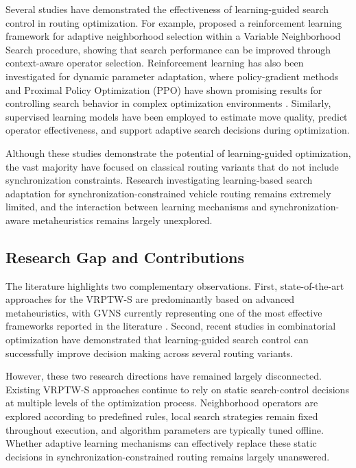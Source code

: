 Several studies have demonstrated the effectiveness of learning-guided search control in routing optimization. For example, \citet{xu2023learning} proposed a reinforcement learning framework for adaptive neighborhood selection within a Variable Neighborhood Search procedure, showing that search performance can be improved through context-aware operator selection. Reinforcement learning has also been investigated for dynamic parameter adaptation, where policy-gradient methods and Proximal Policy Optimization (PPO) have shown promising results for controlling search behavior in complex optimization environments \citep{schulman2017proximal, wang2024csppo}. Similarly, supervised learning models have been employed to estimate move quality, predict operator effectiveness, and support adaptive search decisions during optimization.

Although these studies demonstrate the potential of learning-guided optimization, the vast majority have focused on classical routing variants that do not include synchronization constraints. Research investigating learning-based search adaptation for synchronization-constrained vehicle routing remains extremely limited, and the interaction between learning mechanisms and synchronization-aware metaheuristics remains largely unexplored.

\subsection{Research Gap and Contributions}
The literature highlights two complementary observations. First, state-of-the-art approaches for the VRPTW-S are predominantly based on advanced metaheuristics, with GVNS currently representing one of the most effective frameworks reported in the literature \citep{masmoudi2025generalized}. Second, recent studies in combinatorial optimization have demonstrated that learning-guided search control can successfully improve decision making across several routing variants.

However, these two research directions have remained largely disconnected. Existing VRPTW-S approaches continue to rely on static search-control decisions at multiple levels of the optimization process. Neighborhood operators are explored according to predefined rules, local search strategies remain fixed throughout execution, and algorithm parameters are typically tuned offline. Whether adaptive learning mechanisms can effectively replace these static decisions in synchronization-constrained routing remains largely unanswered.

